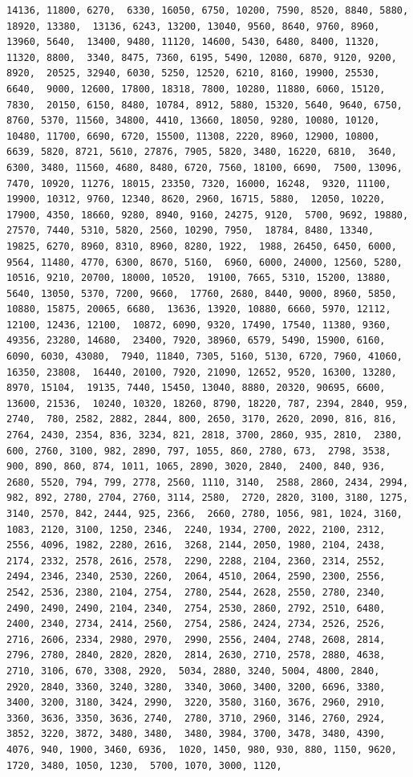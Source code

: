 \documentclass[
]{article}
\begin{document}
\begin{verbatim}
14136, 11800, 6270,  6330, 16050, 6750, 10200, 7590, 8520, 8840, 5880, 18920, 13380,  13136, 6243, 13200, 13040, 9560, 8640, 9760, 8960, 13960, 5640,  13400, 9480, 11120, 14600, 5430, 6480, 8400, 11320, 11320, 8800,  3340, 8475, 7360, 6195, 5490, 12080, 6870, 9120, 9200, 8920,  20525, 32940, 6030, 5250, 12520, 6210, 8160, 19900, 25530, 6640,  9000, 12600, 17800, 18318, 7800, 10280, 11880, 6060, 15120, 7830,  20150, 6150, 8480, 10784, 8912, 5880, 15320, 5640, 9640, 6750,  8760, 5370, 11560, 34800, 4410, 13660, 18050, 9280, 10080, 10120,  10480, 11700, 6690, 6720, 15500, 11308, 2220, 8960, 12900, 10800,  6639, 5820, 8721, 5610, 27876, 7905, 5820, 3480, 16220, 6810,  3640, 6300, 3480, 11560, 4680, 8480, 6720, 7560, 18100, 6690,  7500, 13096, 7470, 10920, 11276, 18015, 23350, 7320, 16000, 16248,  9320, 11100, 19900, 10312, 9760, 12340, 8620, 2960, 16715, 5880,  12050, 10220, 17900, 4350, 18660, 9280, 8940, 9160, 24275, 9120,  5700, 9692, 19880, 27570, 7440, 5310, 5820, 2560, 10290, 7950,  18784, 8480, 13340, 19825, 6270, 8960, 8310, 8960, 8280, 1922,  1988, 26450, 6450, 6000, 9564, 11480, 4770, 6300, 8670, 5160,  6960, 6000, 24000, 12560, 5280, 10516, 9210, 20700, 18000, 10520,  19100, 7665, 5310, 15200, 13880, 5640, 13050, 5370, 7200, 9660,  17760, 2680, 8440, 9000, 8960, 5850, 10880, 15875, 20065, 6680,  13636, 13920, 10880, 6660, 5970, 12112, 12100, 12436, 12100,  10872, 6090, 9320, 17490, 17540, 11380, 9360, 49356, 23280, 14680,  23400, 7920, 38960, 6579, 5490, 15900, 6160, 6090, 6030, 43080,  7940, 11840, 7305, 5160, 5130, 6720, 7960, 41060, 16350, 23808,  16440, 20100, 7920, 21090, 12652, 9520, 16300, 13280, 8970, 15104,  19135, 7440, 15450, 13040, 8880, 20320, 90695, 6600, 13600, 21536,  10240, 10320, 18260, 8790, 18220, 787, 2394, 2840, 959, 2740,  780, 2582, 2882, 2844, 800, 2650, 3170, 2620, 2090, 816, 816,  2764, 2430, 2354, 836, 3234, 821, 2818, 3700, 2860, 935, 2810,  2380, 600, 2760, 3100, 982, 2890, 797, 1055, 860, 2780, 673,  2798, 3538, 900, 890, 860, 874, 1011, 1065, 2890, 3020, 2840,  2400, 840, 936, 2680, 5520, 794, 799, 2778, 2560, 1110, 3140,  2588, 2860, 2434, 2994, 982, 892, 2780, 2704, 2760, 3114, 2580,  2720, 2820, 3100, 3180, 1275, 3140, 2570, 842, 2444, 925, 2366,  2660, 2780, 1056, 981, 1024, 3160, 1083, 2120, 3100, 1250, 2346,  2240, 1934, 2700, 2022, 2100, 2312, 2556, 4096, 1982, 2280, 2616,  3268, 2144, 2050, 1980, 2104, 2438, 2174, 2332, 2578, 2616, 2578,  2290, 2288, 2104, 2360, 2314, 2552, 2494, 2346, 2340, 2530, 2260,  2064, 4510, 2064, 2590, 2300, 2556, 2542, 2536, 2380, 2104, 2754,  2780, 2544, 2628, 2550, 2780, 2340, 2490, 2490, 2490, 2104, 2340,  2754, 2530, 2860, 2792, 2510, 6480, 2400, 2340, 2734, 2414, 2560,  2754, 2586, 2424, 2734, 2526, 2526, 2716, 2606, 2334, 2980, 2970,  2990, 2556, 2404, 2748, 2608, 2814, 2796, 2780, 2840, 2820, 2820,  2814, 2630, 2710, 2578, 2880, 4638, 2710, 3106, 670, 3308, 2920,  5034, 2880, 3240, 5004, 4800, 2840, 2920, 2840, 3360, 3240, 3280,  3340, 3060, 3400, 3200, 6696, 3380, 3400, 3200, 3180, 3424, 2990,  3220, 3580, 3160, 3676, 2960, 2910, 3360, 3636, 3350, 3636, 2740,  2780, 3710, 2960, 3146, 2760, 2924, 3852, 3220, 3872, 3480, 3480,  3480, 3984, 3700, 3478, 3480, 4390, 4076, 940, 1900, 3460, 6936,  1020, 1450, 980, 930, 880, 1150, 9620, 1720, 3480, 1050, 1230,  5700, 1070, 3000, 1120, 
\end{verbatim}
\end{document}
